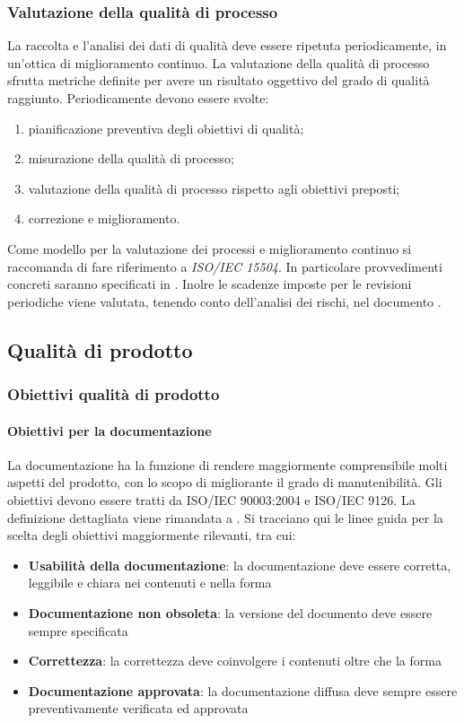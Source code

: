 \documentclass[12pt,a4paper]{article}
\begin{document}
	\subsubsection{Valutazione della qualità di processo}
	La raccolta e l'analisi dei dati di qualità deve essere ripetuta periodicamente, in un'ottica di miglioramento continuo. La valutazione della qualità di processo sfrutta metriche  definite per avere un risultato oggettivo del grado di qualità raggiunto. Periodicamente devono essere svolte:
	\begin{enumerate}
		\item pianificazione preventiva degli obiettivi di qualità;
		\item misurazione della qualità di processo;
		\item valutazione della qualità di processo rispetto agli obiettivi preposti;
		\item correzione e miglioramento.
	\end{enumerate}
	Come modello per la valutazione dei processi e miglioramento continuo si raccomanda di fare riferimento a \textit{ISO/IEC 15504}.
	In particolare provvedimenti concreti saranno specificati in \NdP{}. 
	Inolre le scadenze imposte per le revisioni periodiche viene valutata, tenendo  conto dell'analisi dei rischi, nel documento \PdP{}.

	
	\subsection{Qualità di prodotto}
	
	\subsubsection{Obiettivi qualità di prodotto}
	
	\paragraph{Obiettivi per la documentazione}
	La documentazione ha la funzione di rendere maggiormente comprensibile molti aspetti del prodotto, con lo scopo di migliorante il grado di manutenibilità. 
	Gli obiettivi devono essere tratti da ISO/IEC 90003:2004 e ISO/IEC 9126. La definizione dettagliata viene rimandata a \NdP{}.
	Si tracciano qui le linee guida per la scelta degli obiettivi maggiormente rilevanti, tra cui:
	
	\begin{itemize}
		\item\textbf{Usabilità della documentazione}: la documentazione deve essere corretta, leggibile e chiara nei contenuti e nella forma
		\item\textbf{Documentazione non obsoleta}: la versione del documento deve essere sempre specificata
		\item\textbf{Correttezza}: la correttezza deve coinvolgere i contenuti oltre che la forma
		\item\textbf{Documentazione approvata}: la documentazione diffusa deve sempre essere preventivamente verificata ed approvata
	\end{itemize}
	
\end{document}
